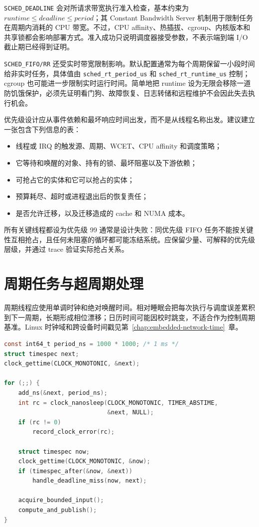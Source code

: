 \texttt{SCHED\_DEADLINE} 会对所请求带宽执行准入检查，基本约束为 $runtime \le deadline \le period$；其 Constant Bandwidth Server 机制用于限制任务在周期内消耗的 CPU 带宽\cite{linux-sched-deadline}。不过，CPU affinity、热插拔、cgroup、内核版本和共享锁都会影响部署方式。准入成功只说明调度器接受参数，不表示端到端 I/O 截止期已经得到证明。

\texttt{SCHED\_FIFO/RR} 还受实时带宽限制影响。默认配置通常为每个周期保留一小段时间给非实时任务，具体值由 \texttt{sched\_rt\_period\_us} 和 \texttt{sched\_rt\_runtime\_us} 控制；cgroup 也可能进一步限制实时运行时间\cite{linux-sched-rt-group}。简单地把 runtime 设为无限会移除一道防饥饿保护，必须先证明看门狗、故障恢复、日志转储和远程维护不会因此失去执行机会。

优先级设计应从事件依赖和最坏响应时间出发，而不是从线程名称出发。建议建立一张包含下列信息的表：

\begin{itemize}
  \item 线程或 IRQ 的触发源、周期、WCET、CPU affinity 和调度策略；
  \item 它等待和唤醒的对象、持有的锁、最坏阻塞以及下游依赖；
  \item 可抢占它的实体和它可以抢占的实体；
  \item 预算耗尽、超时或进程退出后的恢复责任；
  \item 是否允许迁移，以及迁移造成的 cache 和 NUMA 成本。
\end{itemize}

所有关键线程都设为优先级 99 通常是设计失败：同优先级 FIFO 任务不能按关键性互相抢占，且任何未阻塞的循环都可能冻结系统。应保留少量、可解释的优先级层级，并通过 trace 验证实际抢占关系。

\section{周期任务与超周期处理}

周期线程应使用单调时钟和绝对唤醒时间。相对睡眠会把每次执行与调度误差累积到下一周期，长期形成相位漂移；日历时间可能因校时跳变，不适合作为控制周期基准。Linux 时钟域和跨设备时间戳见\mbox{第~\ref{chap:embedded-network-time}~章}。

\begin{lstlisting}[language=C,caption={使用绝对时间驱动周期任务的基本结构}]
const int64_t period_ns = 1000 * 1000; /* 1 ms */
struct timespec next;
clock_gettime(CLOCK_MONOTONIC, &next);

for (;;) {
    add_ns(&next, period_ns);
    int rc = clock_nanosleep(CLOCK_MONOTONIC, TIMER_ABSTIME,
                             &next, NULL);
    if (rc != 0)
        record_clock_error(rc);

    struct timespec now;
    clock_gettime(CLOCK_MONOTONIC, &now);
    if (timespec_after(&now, &next))
        handle_deadline_miss(now, next);

    acquire_bounded_input();
    compute_and_publish();
}
\end{lstlisting}

